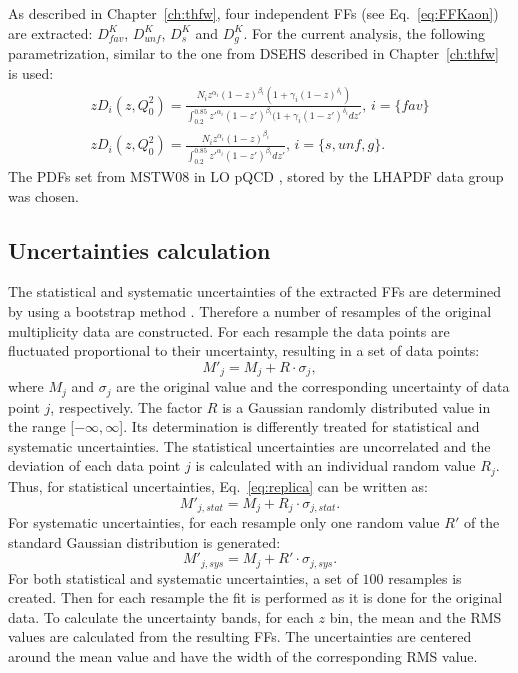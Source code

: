 As described in Chapter~\ref{ch:thfw}, four independent FFs (see Eq.~\ref{eq:FFKaon}) are extracted: $D^K_{fav}$, $D^K_{unf}$, $D^K_{s}$ and $D^K_{g}$.
For the current analysis, the following parametrization, similar to the one from DSEHS described in Chapter~\ref{ch:thfw} is used:
%
\begin{equation}
  \begin{split}
    zD_i(z,Q^2_0) = \frac{N_i z^{\alpha_i} (1-z)^{\beta_i} (1+\gamma_i(1-z)^{\delta_i})}{\int_{0.2}^{0.85} z'^{\alpha_i} (1-z')^{\beta_i} (1+\gamma_i(1-z')^{\delta_i} dz'},\,i=\{fav\} \\
    zD_i(z,Q^2_0) = \frac{N_i z^{\alpha_i} (1-z)^{\beta_i}}{\int_{0.2}^{0.85} z'^{\alpha_i} (1-z')^{\beta_i} dz'},\,i=\{s,unf,g\}.
  \end{split}
\end{equation}
%
The PDFs set from MSTW$08$ in LO pQCD \cite{MSTW08}, stored by the LHAPDF data group \cite{LHAPDF} was chosen.

\subsection{Uncertainties calculation}

The statistical and systematic uncertainties of the extracted FFs are determined by using a bootstrap method \cite{replicas}. Therefore a number of resamples of the original multiplicity data are constructed. For each resample the data points are fluctuated proportional to their uncertainty, resulting in a set of data points:
%
\begin{equation}\label{eq:replica}
  M'_j = M_j + R \cdot \sigma_j,
\end{equation}
%
where $M_j$ and $\sigma_j$ are the original value and the corresponding uncertainty of data point $j$, respectively. The factor $R$ is a Gaussian randomly distributed value in the range [$-\infty,\infty$]. Its determination is differently treated for statistical and systematic uncertainties.
The statistical uncertainties are uncorrelated and the deviation of each data point $j$ is calculated with an individual random value $R_j$. Thus, for statistical uncertainties, Eq.~\ref{eq:replica} can be written as:
%
\begin{equation}\label{eq:replica}
  M'_{j,stat} = M_j + R_j \cdot \sigma_{j,stat}.
\end{equation}
%
For systematic uncertainties, for each resample only one random value $R'$ of the standard Gaussian distribution is generated:
%
\begin{equation}\label{eq:replica}
  M'_{j,sys} = M_j + R' \cdot \sigma_{j,sys}.
\end{equation}
%
For both statistical and systematic uncertainties, a set of $100$ resamples is created. Then for each resample the fit is performed as it is done for the original data. To calculate the uncertainty bands, for each $z$ bin, the mean and the RMS values are calculated from the resulting FFs. The uncertainties are centered around the mean value and have the width of the corresponding RMS value.

